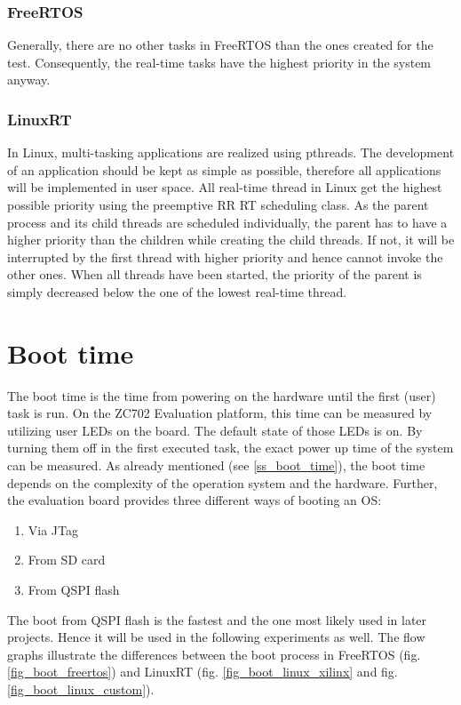 \subsubsection{FreeRTOS}
Generally, there are no other tasks in FreeRTOS than the ones created for the test.
Consequently, the real-time tasks have the highest priority in the system anyway.

\subsubsection{LinuxRT}
In Linux, multi-tasking applications are realized using pthreads.
The development of an application should be kept as simple as possible, therefore all applications will be implemented in user space.
All real-time thread in Linux get the highest possible priority using the preemptive \ac{RR} \ac{RT} scheduling class.
As the parent process and its child threads are scheduled individually, the parent has to have a higher priority than the children while creating the child threads.
If not, it will be interrupted by the first thread with higher priority and hence cannot invoke the other ones.
When all threads have been started, the priority of the parent is simply decreased below the one of the lowest real-time thread.
 
\section{Boot time}\label{s_boot_time}
The boot time is the time from powering on the hardware until the first (user) task is run. 
On the ZC702 Evaluation platform, this time can be measured by utilizing user \acp{LED} on the board.  
The default state of those \acp{LED} is on.
By turning them off in the first executed task, the exact power up time of the system can be measured.  
As already mentioned (see \ref{ss_boot_time}), the boot time depends on the complexity of the operation system and the hardware. 
Further, the evaluation board provides three different ways of booting an \ac{OS}:
\begin{enumerate}
	\item Via \ac{JTag}
	\item From \ac{SD} card
	\item From \ac{QSPI} flash
\end{enumerate}
The boot from \ac{QSPI} flash is the fastest and the one most likely used in later projects.
Hence it will be used in the following experiments as well.
The flow graphs illustrate the differences between the boot process in FreeRTOS (fig. \ref{fig_boot_freertos}) and LinuxRT (fig. \ref{fig_boot_linux_xilinx} and fig. \ref{fig_boot_linux_custom}).

